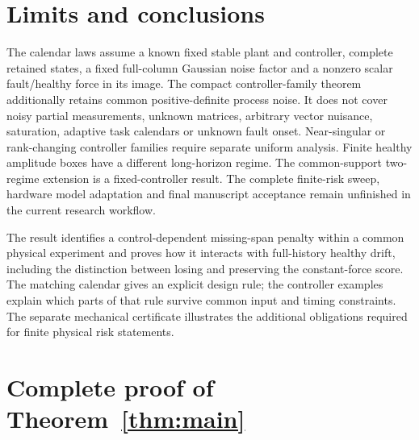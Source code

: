 \documentclass[11pt]{article}
\begin{document}
\section{Limits and conclusions}
The calendar laws assume a known fixed stable plant and controller, complete
retained states, a fixed full-column Gaussian noise factor and a nonzero scalar
fault/healthy force in its image. The compact controller-family theorem
additionally retains common positive-definite process noise.
It does not cover noisy partial measurements, unknown matrices, arbitrary
vector nuisance, saturation, adaptive task calendars or unknown fault onset.
Near-singular or rank-changing controller families require separate uniform
analysis. Finite healthy amplitude boxes have a different long-horizon regime.
The common-support two-regime extension is a fixed-controller result.
The complete finite-risk sweep, hardware model adaptation and final manuscript
acceptance remain unfinished in the current research workflow.

The result identifies a control-dependent missing-span penalty within a
common physical experiment and proves how it interacts with full-history
healthy drift, including the distinction between losing and preserving the
constant-force score. The matching calendar gives an explicit design rule; the
controller examples explain which parts of that rule survive common input
and timing constraints. The separate mechanical certificate illustrates the
additional obligations required for finite physical risk statements.

\appendix
\section{Complete proof of Theorem~\ref{thm:main}}\label{sec:proof}
\end{document}
